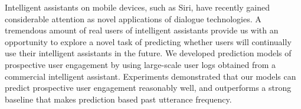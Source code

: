 Intelligent assistants on mobile devices, such as Siri, have recently gained considerable attention as novel applications of dialogue technologies. A tremendous amount of real users of intelligent assistants provide us with an opportunity to explore a novel task of predicting whether users will continually use their intelligent assistants in the future. We developed prediction models of prospective user engagement by using large-scale user logs obtained from a commercial intelligent assistant. Experiments demonstrated that our models can predict prospective user engagement reasonably well, and outperforms a strong baseline that makes prediction based past utterance frequency.
